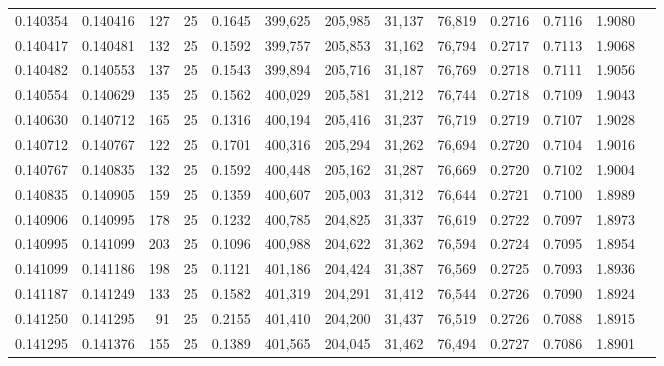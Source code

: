\begin{tabular}{rrrrrrrrrrrrr}
0.140354 & 0.140416 &   127 &  25 &                                     0.1645 & 399,625 & 205,985 &  31,137 &  76,819 & 0.2716 & 0.7116 & 1.9080 \\
0.140417 & 0.140481 &   132 &  25 &                                     0.1592 & 399,757 & 205,853 &  31,162 &  76,794 & 0.2717 & 0.7113 & 1.9068 \\
0.140482 & 0.140553 &   137 &  25 &                                     0.1543 & 399,894 & 205,716 &  31,187 &  76,769 & 0.2718 & 0.7111 & 1.9056 \\
0.140554 & 0.140629 &   135 &  25 &                                     0.1562 & 400,029 & 205,581 &  31,212 &  76,744 & 0.2718 & 0.7109 & 1.9043 \\
0.140630 & 0.140712 &   165 &  25 &                                     0.1316 & 400,194 & 205,416 &  31,237 &  76,719 & 0.2719 & 0.7107 & 1.9028 \\
0.140712 & 0.140767 &   122 &  25 &                                     0.1701 & 400,316 & 205,294 &  31,262 &  76,694 & 0.2720 & 0.7104 & 1.9016 \\
0.140767 & 0.140835 &   132 &  25 &                                     0.1592 & 400,448 & 205,162 &  31,287 &  76,669 & 0.2720 & 0.7102 & 1.9004 \\
0.140835 & 0.140905 &   159 &  25 &                                     0.1359 & 400,607 & 205,003 &  31,312 &  76,644 & 0.2721 & 0.7100 & 1.8989 \\
0.140906 & 0.140995 &   178 &  25 &                                     0.1232 & 400,785 & 204,825 &  31,337 &  76,619 & 0.2722 & 0.7097 & 1.8973 \\
0.140995 & 0.141099 &   203 &  25 &                                     0.1096 & 400,988 & 204,622 &  31,362 &  76,594 & 0.2724 & 0.7095 & 1.8954 \\
0.141099 & 0.141186 &   198 &  25 &                                     0.1121 & 401,186 & 204,424 &  31,387 &  76,569 & 0.2725 & 0.7093 & 1.8936 \\
0.141187 & 0.141249 &   133 &  25 &                                     0.1582 & 401,319 & 204,291 &  31,412 &  76,544 & 0.2726 & 0.7090 & 1.8924 \\
0.141250 & 0.141295 &    91 &  25 &                                     0.2155 & 401,410 & 204,200 &  31,437 &  76,519 & 0.2726 & 0.7088 & 1.8915 \\
0.141295 & 0.141376 &   155 &  25 &                                     0.1389 & 401,565 & 204,045 &  31,462 &  76,494 & 0.2727 & 0.7086 & 1.8901 \\

\end{tabular}
